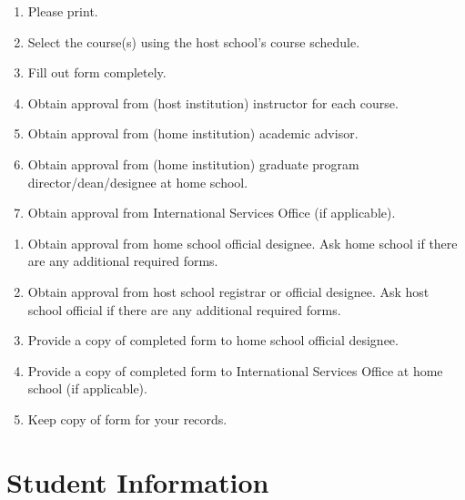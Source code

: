 \documentclass[10pt]{article}
\begin{document}
\noindent
\begin{minipage}{0.5\textwidth}
    \begin{enumerate}
    \setlength{\itemsep}{0.05em}
        \item Please print.
        \item Select the course(s) using the host school's course schedule.
        \item Fill out form completely.
        \item Obtain approval from (host institution) instructor for each course.
        \item Obtain approval from (home institution) academic advisor.
        \item Obtain approval from (home institution) graduate program director/dean/designee at home school.
        \item Obtain approval from International Services Office (if applicable).
    \end{enumerate}
\end{minipage}%
\hspace{0.2cm}
\begin{minipage}{0.5\textwidth}
    \begin{enumerate}
    \setlength{\itemsep}{0.05em}
        \setcounter{enumi}{7}
        \item Obtain approval from home school official designee. Ask home school if there are any additional required forms.
        \item Obtain approval from host school registrar or official designee. Ask host school official if there are any additional required forms.
        \item Provide a copy of completed form to home school official designee.
        \item Provide a copy of completed form to International Services Office at home school (if applicable).
        \item Keep copy of form for your records.
    \end{enumerate}
\end{minipage}

\section*{Student Information}
\end{document}
